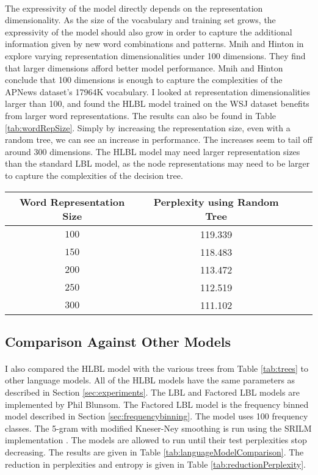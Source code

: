 \paragraph{}
The expressivity of the model directly depends on the representation dimensionality. As the size of the vocabulary and training set grows, the expressivity of the model should also grow in order to capture the additional information given by new word combinations and patterns. Mnih and Hinton in \cite{MnihHinton2009} explore varying representation dimensionalities under 100 dimensions. They find that larger dimensions afford better model performance. Mnih and Hinton conclude that 100 dimensions is enough to capture the complexities of the APNews dataset's 17964K vocabulary. I looked at representation dimensionalities larger than 100, and found the HLBL model trained on the WSJ dataset benefits from larger word representations. The results can also be found in Table \ref{tab:wordRepSize}. Simply by increasing the representation size, even with a random tree, we can see an increase in performance. The increases seem to tail off around 300 dimensions.  The HLBL model may need larger representation sizes than the standard LBL model, as the node representations may need to be larger to capture the complexities of the decision tree.


\begin{table*} \centering
{}
\begin{tabular}{@{}cccc@{}}\toprule
Word Representation Size & Perplexity using Random Tree\\ 
\midrule
$100$ & 119.339 \\
$150$ & 118.483 \\
$200$ & 113.472 \\
$250$ & 112.519 \\
$300$ & 111.102 \\
\bottomrule
\end{tabular}
\caption{The effect of word representation size on test perplexity.}
\label{tab:wordRepSize}
\end{table*}

\subsection{Comparison Against Other Models}
\paragraph{}
I also compared the HLBL model with the various trees from Table \ref{tab:trees} to other language models. All of the HLBL models have the same parameters as described in Section \ref{sec:experiments}. The LBL and Factored LBL models are implemented by Phil Blunsom. The Factored LBL model is the frequency binned model described in Section \ref{sec:frequencybinning}. The model uses 100 frequency classes. The 5-gram with modified Kneser-Ney smoothing is run using the SRILM implementation \cite{Alumae2010}.
The models are allowed to run until their test perplexities stop decreasing. The results are given in Table \ref{tab:languageModelComparison}. The reduction in perplexities and entropy is given in Table \ref{tab:reductionPerplexity}. 

